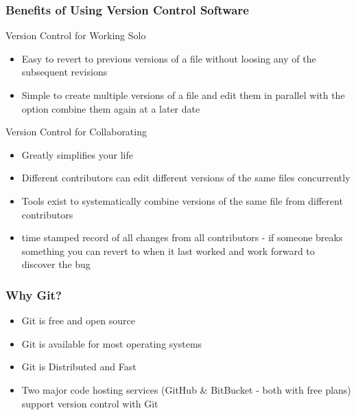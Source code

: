 \documentclass[xcolor=dvipsnames]{beamer}
\begin{document}
\begin{frame}
\frametitle{Benefits of Using Version Control Software}
\begin{block}{Version Control for Working Solo}
\begin{itemize}
\item Easy to revert to previous versions of a file without loosing any of the subsequent revisions
\item Simple to create multiple versions of a file and edit them in parallel with the option combine them again at a later date
\end{itemize}
\end{block}

\begin{block}{Version Control for Collaborating}
\begin{itemize}
\item Greatly simplifies your life
\item Different contributors can edit different versions of the same files concurrently 
\item Tools exist to systematically combine versions of the same file from different contributors
\item time stamped record of all changes from all contributors - if someone breaks something you can revert to when it last worked and work forward to discover the bug 
\end{itemize}
\end{block}

\end{frame}

\begin{frame}
\frametitle{Why Git?}
\begin{itemize}
\item Git is free and open source
\newline
\newline
\item Git is available for most operating systems
\newline
\newline
\item Git is Distributed and Fast
\newline
\newline
\item Two major code hosting services (GitHub \& BitBucket - both with free plans) support version control with Git
\end{itemize}
\end{frame}
\end{document}
